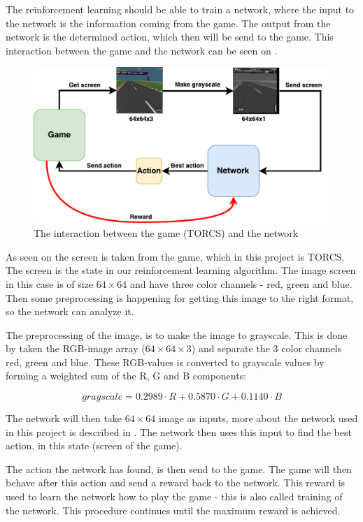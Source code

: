 The reinforcement learning should be able to train a network, where the input to the network is the information coming from the game. The output from the network is the determined action, which then will be send to the game. This interaction between the game and the network can be seen on .    
 
\begin{figure}[H]
	\centering
	\includegraphics[width=1\textwidth]{Figures/Architecture/TORCS_interaction.pdf}
	\caption{The interaction between the game (TORCS) and the network }
	\label{fig:TORCS_interaction}
\end{figure}

 
As seen on  the screen is taken from the game, which in this project is TORCS. The screen is the state in our reinforcement learning algorithm. The image screen in this case is of size $64 \times 64$ and have three color channels - red, green and blue. Then some preprocessing is happening for getting this image to the right format, so the network can analyze it. 

 The preprocessing of the image, is to make the image to grayscale. This is done by taken the RGB-image array ($64 \times 64 \times 3$) and separate the 3 color channels red, green and blue. These RGB-values is converted to grayscale values by forming a weighted sum of the R, G and B components:

\begin{equation}
grayscale = 0.2989 \cdot R + 0.5870 \cdot G + 0.1140 \cdot B 
\end{equation}  

The network will then take $64 \times 64 $ image as inputs, more about the network used in this project is described in . The network then uses this input to find the best action, in this state (screen of the game). 

The action the network has found, is then send to the game. The game will then behave after this action and send a reward back to the network. This reward is used to learn the network how to play the game - this is also called training of the network. This procedure continues until the maximum reward is achieved.   
 

 

 
   